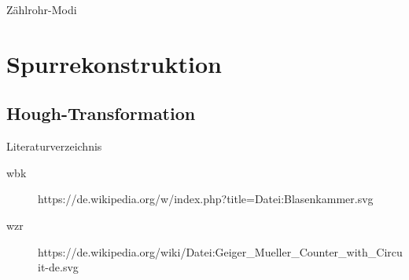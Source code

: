 \documentclass{beamer}
\begin{document}

\begin{frame}{Zählrohr-Modi}
\end{frame}


\section{Spurrekonstruktion}


\subsection{Hough-Transformation}



\begin{frame}{Literaturverzeichnis}
	\begin{adjustwidth}{-5em}{-2em}
	  	\begin{description}
		  	\item[wbk]
		  	https://de.wikipedia.org/w/index.php?title=Datei:Blasenkammer.svg
		  	\item[wzr]
		  	https://de.wikipedia.org/wiki/Datei:Geiger\_Mueller\_Counter\_with\_Circuit-de.svg
		\end{description}
	\end{adjustwidth}  
\end{frame}
\end{document}
